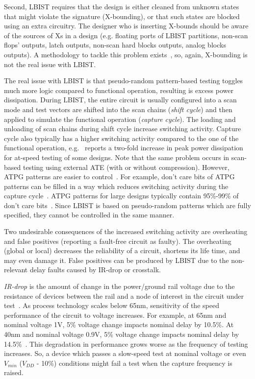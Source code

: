 \documentclass[conference]{IEEEtran}
\begin{document}
Second, LBIST requires that the design is either cleaned from unknown states that might violate the signature (X-bounding), or that such states are blocked using an extra circuitry. 
The designer who is inserting X-bounds should be aware of the sources of Xs in a design (e.g. floating ports of LBIST partitions, non-scan flops' outputs, latch outputs, non-scan hard blocks outputs, analog blocks outputs). A methodology to tackle this problem exists~\cite{Xbound}, so, again, X-bounding is not the real issue with LBIST.
 
The real issue with LBIST is that pseudo-random pattern-based testing 
toggles much more logic compared to functional operation, resulting is excess power dissipation.
During LBIST, the entire circuit is usually configured into a scan mode and test vectors are shifted into the scan chains ({\em shift cycle}) and then applied to simulate the functional operation ({\em capture cycle}). The loading and unloading of scan chains during shift cycle increase switching activity. Capture cycle also typically has a higher switching activity compared to the one of the functional operation, e.g.~\cite{Sa03} reports a two-fold increase in peak power dissipation for at-speed testing of some designs. Note that the same problem occurs in scan-based testing using external ATE (with or without compression). However, ATPG patterns are easier to control~\cite{BuSJ04,LiRP05}. For example, don't care bits of ATPG patterns can be filled in a way which reduces switching activity during the capture cycle~\cite{WeYM05,ReXZ06,WeNM12}. 
ATPG patterns for large designs typically contain 95\%-99\% of don't care bits~\cite{WaC05}.
Since LBIST is based on pseudo-random patterns which are fully specified, they cannot be controlled in the same manner.

Two undesirable consequences of the increased switching activity are overheating and false positives (reporting a fault-free circuit as faulty). The overheating (global or local) decreases the reliability of a circuit, shortens its life time, and may even damage it. False positives can be produced by LBIST due to the non-relevant delay faults caused by IR-drop or crosstalk. 

{\em IR-drop} is the amount of change in the power/ground rail voltage due to the resistance of devices between the rail and a node of interest in the circuit under test~\cite{Sa03}. As process technology scales below 65nm, sensitivity of the speed performance of the circuit to voltage increases. For example, at 65nm and nominal voltage 1V, 5\% voltage change impacts nominal delay by 10.5\%. At 40nm and nominal voltage 0.9V, 5\% voltage change impacts nominal delay by 14.5\%~\cite{Kr08}. This degradation in performance grows worse as the frequency of testing increases. So, a device which passes a slow-speed test at nominal voltage or even $V_{min}$ ($V_{DD}$ - 10\%) conditions might fail a test when the capture frequency is raised.
\end{document}
